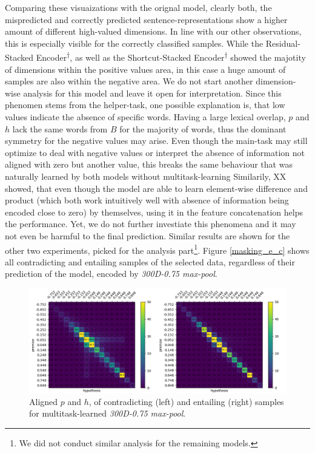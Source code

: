 Comparing these visuaizations with the orignal model, clearly both, the mispredicted and correctly predicted sentence-representations show a higher amount of different high-valued dimensions. In line with our other observations, this is especially visible for the correctly classified samples. While the Residual-Stacked Encoder\textsuperscript{$\dagger$}, as well as the Shortcut-Stacked Encoder\textsuperscript{$\dagger$} showed the majotity of dimensions within the positive values area, in this case a huge amount of samples are also within the negative area. We do not start another dimension-wise analysis for this model and leave it open for interpretation. Since this phenomen stems from the helper-task, one possible explanation is, that low values indicate the absence of specific words. Having a large lexical overlap, $p$ and $h$ lack the same words from $B$ for the majority of words, thus the dominant symmetry for the negative values may arise. Even though the main-task may still optimize to deal with negative values or interpret the absence of information not aligned with zero but another value, this breaks the same behaviour that was naturally learned by both models without multitask-learning Similarily, XX showed, that even though the model are able to learn element-wise difference and product (which both work intuitively well with absence of information being encoded close to zero) by themselves, using it in the feature concatenation helps the performance. Yet, we do not further investiate this phenomena and it may not even be harmful to the final prediction. Similar results are shown for the other two experiments, picked for the analysis part\footnote{We did not conduct similar analysis for the remaining models.}. Figure \ref{masking_e_c} shows all contradicting and entailing samples of the selected data, regardless of their prediction of the model, encoded by \textit{300D-0.75 max-pool}.
\begin{figure}[tph!]
\centering
	\includegraphics[totalheight=7cm]{fig/masking_e_c.png}
	\caption{Aligned $p$ and $h$, of contradicting (left) and entailing (right) samples for multitask-learned \textit{300D-0.75 max-pool}.}
	\label{fig:masking_e_c}
\end{figure}
